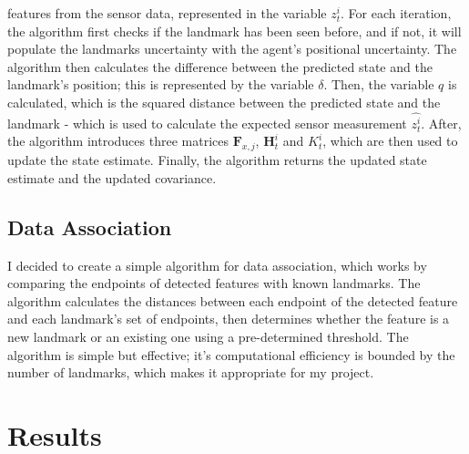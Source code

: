 \documentclass[12pt]{article}
\begin{document}
features from the sensor data, represented in the variable \(z^i_t\). For each iteration, the algorithm first checks if the landmark has been
seen before, and if not, it will populate the landmarks uncertainty with the agent's positional uncertainty. The algorithm then calculates
the difference between the predicted state and the landmark's position; this is represented by the variable \(\delta\). Then, the variable
\(q\) is calculated, which is the squared distance between the predicted state and the landmark - which is used to calculate the expected
sensor measurement \(\hat{z^i_t}\). After, the algorithm introduces three matrices \(\mathbf{F}_{x,j}\), \(\mathbf{H}_t^i\) and \(K_t^i\), which
are then used to update the state estimate. Finally, the algorithm returns the updated state estimate and the updated covariance.\\

\subsection{Data Association}
I decided to create a simple algorithm for data association, which works by comparing the endpoints of detected features with known
landmarks. The algorithm calculates the distances between each endpoint of the detected feature and each landmark's set of endpoints,
then determines whether the feature is a new landmark or an existing one using a pre-determined threshold. The algorithm is simple
but effective; it's computational efficiency is bounded by the number of landmarks, which makes it appropriate for my project.\\

\section{Results}
\end{document}
